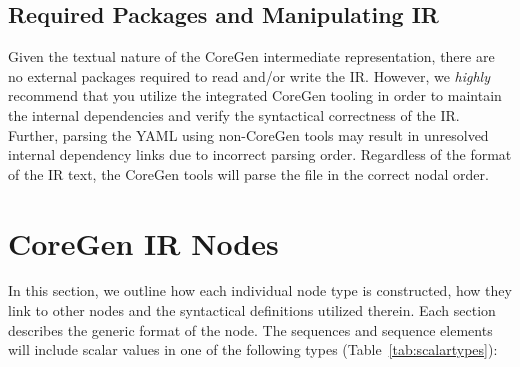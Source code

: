 \documentclass{article}
\begin{document}
\clearpage


\subsection{Required Packages and Manipulating IR}

Given the textual nature of the CoreGen intermediate representation, there are no external 
packages required to read and/or write the IR.  However, we \textit{highly} recommend that 
you utilize the integrated CoreGen tooling in order to maintain the internal dependencies and 
verify the syntactical correctness of the IR.  Further, parsing the YAML using non-CoreGen 
tools may result in unresolved internal dependency links due to incorrect parsing order.  
Regardless of the format of the IR text, the CoreGen tools will parse the file in the correct nodal 
order.  

 
\clearpage
\section{CoreGen IR Nodes}
\label{sec:CoreGenIRNodes}

In this section, we outline how each individual node type is constructed, how they link 
to other nodes and the syntactical definitions utilized therein.  Each section describes 
the generic format of the node.  The sequences and sequence elements will include 
scalar values in one of the following types (Table~\ref{tab:scalartypes}):
\end{document}
